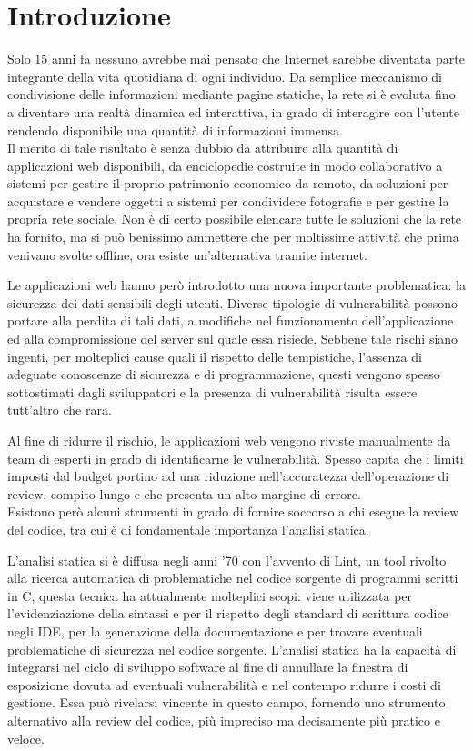 \chapter{Introduzione}
Solo 15 anni fa nessuno avrebbe mai pensato che Internet sarebbe diventata parte integrante della vita quotidiana di ogni individuo. Da semplice meccanismo di condivisione delle informazioni mediante pagine statiche, la rete si è evoluta fino a diventare una realtà dinamica ed interattiva, in grado di interagire con l'utente rendendo disponibile una quantità di informazioni immensa.\\
Il merito di tale risultato è senza dubbio da attribuire alla quantità di applicazioni web disponibili, da enciclopedie costruite in modo collaborativo a sistemi per gestire il proprio patrimonio economico da remoto, da soluzioni per acquistare e vendere oggetti a sistemi per condividere fotografie e per gestire la propria rete sociale. Non è di certo possibile elencare tutte le soluzioni che la rete ha fornito, ma si può benissimo ammettere che per moltissime attività che prima venivano svolte offline, ora esiste un'alternativa tramite internet.

Le applicazioni web hanno però introdotto una nuova importante problematica: la sicurezza dei dati sensibili degli utenti. Diverse tipologie di vulnerabilità possono portare alla perdita di tali dati, a modifiche nel funzionamento dell'applicazione ed alla compromissione del server sul quale essa risiede. Sebbene tale rischi siano ingenti, per molteplici cause quali il rispetto delle tempistiche, l'assenza di adeguate conoscenze di sicurezza e di programmazione, questi vengono spesso sottostimati dagli sviluppatori e la presenza di vulnerabilità risulta essere tutt'altro che rara.

Al fine di ridurre il rischio, le applicazioni web vengono riviste manualmente da team di esperti in grado di identificarne le vulnerabilità. Spesso capita che i limiti imposti dal budget portino ad una riduzione nell'accuratezza dell'operazione di review, compito lungo e che presenta un alto margine di errore.\\
Esistono però alcuni strumenti in grado di fornire soccorso a chi esegue la review del codice, tra cui è di fondamentale importanza l'analisi statica.

L'analisi statica si è diffusa negli anni '70 con l'avvento di Lint, un tool rivolto alla ricerca automatica di problematiche nel codice sorgente di programmi scritti in C, questa tecnica ha attualmente molteplici scopi: viene utilizzata per l'evidenziazione della sintassi e per il rispetto degli standard di scrittura codice negli IDE, per la generazione della documentazione e per trovare eventuali problematiche di sicurezza nel codice sorgente.
L'analisi statica ha la capacità di integrarsi nel ciclo di sviluppo software al fine di annullare la finestra di esposizione dovuta ad eventuali vulnerabilità e nel contempo ridurre i costi di gestione. Essa può rivelarsi vincente in questo campo, fornendo uno strumento alternativo alla review del codice, più impreciso ma decisamente più pratico e veloce.


